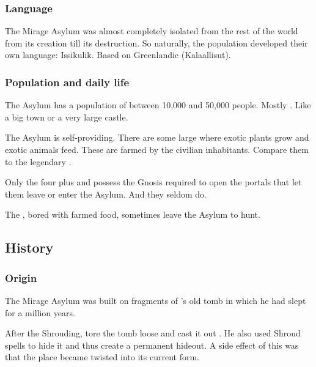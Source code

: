 \subsubsection{Language}
The Mirage Asylum was almost completely isolated from the rest of the world from its creation till its destruction. 
So naturally, the population developed their own language: 
Issikulik. 
Based on Greenlandic (Kalaallisut). 





\subsubsection{Population and daily life}
The Asylum has a population of between 10,000 and 50,000 people. 
Mostly \scathae. 
Like a big town or a very large castle. 

The Asylum is self-providing. 
There are some large  where exotic plants grow and exotic animals feed. 
These are farmed by the civilian inhabitants. 
Compare them to the legendary . 

Only the four \dragons{} plus  and  possess the Gnosis required to open the portals that let them leave or enter the Asylum. 
And they seldom do. 

The \dragons{}, bored with farmed food, sometimes leave the Asylum to hunt. 









\subsection{History}





\subsubsection{Origin}
The Mirage Asylum was built on fragments of \Ishnaruchaefir's old tomb in which he had slept for a million years.

After the Shrouding, \Ishnaruchaefir tore the tomb loose and cast it out . 
He also used Shroud spells to hide it and thus create a permanent hideout. 
A side effect of this was that the place became twisted into its current form. 





